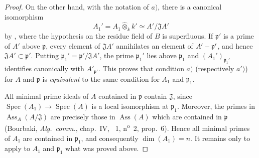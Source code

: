 \begin{proof}
On the other hand, with the notation of $a)$, there is a canonical isomorphism
\[
  A_1'=A_1\widehat{\otimes}_kk'
  \simeq A'/\mathfrak JA'
\]
by , where the hypothesis on the residue field of $B$ is superfluous. If $\mathfrak p'$ is a prime of $A'$ above $\mathfrak p$, every element of $\mathfrak JA'$ annihilates an element of $A'-\mathfrak p'$, and hence $\mathfrak JA'\subset\mathfrak p'$. Putting $\mathfrak p_1'=\mathfrak p'/\mathfrak JA'$, the prime $\mathfrak p_1'$ lies above $\mathfrak p_1$ and $(A_1')_{\mathfrak p_1'}$ identifies canonically with $A'_{\mathfrak p'}$. This proves that condition $a)$ (respectively $a')$) for $A$ and $\mathfrak p$ is \emph{equivalent} to the same condition for $A_1$ and $\mathfrak p_1$.

All minimal prime ideals of $A$ contained in $\mathfrak p$ contain $\mathfrak J$, since $\operatorname{Spec}(A_1)\to\operatorname{Spec}(A)$ is a local isomorphism at $\mathfrak p_1$. Moreover, the primes in $\operatorname{Ass}_{A}(A/\mathfrak J)$ are precisely those in $\operatorname{Ass}(A)$ which are contained in $\mathfrak p$ (Bourbaki, \emph{Alg.\ comm.}, chap.~IV, \textsection~1, n\textsuperscript{o}~2, prop.~6). Hence all minimal primes of $A_1$ are contained in $\mathfrak p_1$, and consequently $\dim(A_1)=n$. It remains only to apply to $A_1$ and $\mathfrak p_1$ what was proved above.
\end{proof}

